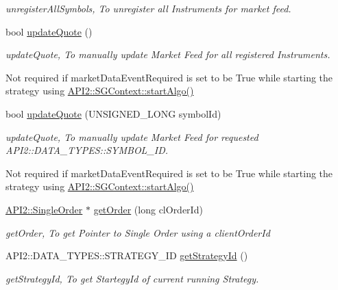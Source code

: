 \begin{DoxyCompactItemize}
\begin{DoxyCompactList}\small\item\em unregister\-All\-Symbols, To unregister all Instruments for market feed. \end{DoxyCompactList}\item 
bool \hyperlink{class_a_p_i2_1_1_s_g_context_a6041b2e2653f2f7d0fd86b253abad209}{update\-Quote} ()
\begin{DoxyCompactList}\small\item\em update\-Quote, To manually update Market Feed for all registered Instruments.\par
 Not required if market\-Data\-Event\-Required is set to be True while starting the strategy using \hyperlink{class_a_p_i2_1_1_s_g_context_a44cb008b60a1e0a376c6d7909bd11de2}{A\-P\-I2\-::\-S\-G\-Context\-::start\-Algo()} \end{DoxyCompactList}\item 
bool \hyperlink{class_a_p_i2_1_1_s_g_context_abff1974dcd281fe856a0d81399d548b8}{update\-Quote} (U\-N\-S\-I\-G\-N\-E\-D\-\_\-\-L\-O\-N\-G symbol\-Id)
\begin{DoxyCompactList}\small\item\em update\-Quote, To manually update Market Feed for requested A\-P\-I2\-::\-D\-A\-T\-A\-\_\-\-T\-Y\-P\-E\-S\-::\-S\-Y\-M\-B\-O\-L\-\_\-\-I\-D.\par
 Not required if market\-Data\-Event\-Required is set to be True while starting the strategy using \hyperlink{class_a_p_i2_1_1_s_g_context_a44cb008b60a1e0a376c6d7909bd11de2}{A\-P\-I2\-::\-S\-G\-Context\-::start\-Algo()} \end{DoxyCompactList}\item 
\hyperlink{class_a_p_i2_1_1_single_order}{A\-P\-I2\-::\-Single\-Order} $\ast$ \hyperlink{class_a_p_i2_1_1_s_g_context_ae49290cac1f27ba3049f1f5f5075cc49}{get\-Order} (long cl\-Order\-Id)
\begin{DoxyCompactList}\small\item\em get\-Order, To get Pointer to Single Order using a client\-Order\-Id \end{DoxyCompactList}\item 
A\-P\-I2\-::\-D\-A\-T\-A\-\_\-\-T\-Y\-P\-E\-S\-::\-S\-T\-R\-A\-T\-E\-G\-Y\-\_\-\-I\-D \hyperlink{class_a_p_i2_1_1_s_g_context_abffd48797b85fe57108f02ad77f3c009}{get\-Strategy\-Id} ()
\begin{DoxyCompactList}\small\item\em get\-Strategy\-Id, To get Startegy\-Id of current running Strategy. \end{DoxyCompactList}\item 

\end{DoxyCompactItemize}
